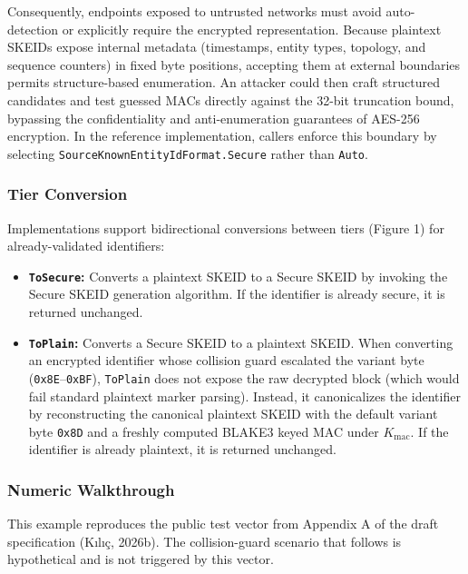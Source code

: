 \documentclass[fleqn,10pt]{wlpeerj}
\providecommand{\tightlist}{%
  \setlength{\itemsep}{0pt}\setlength{\parskip}{0pt}}
\begin{document}
Consequently, endpoints exposed to untrusted networks must avoid
auto-detection or explicitly require the encrypted representation.
Because plaintext SKEIDs expose internal metadata (timestamps, entity
types, topology, and sequence counters) in fixed byte positions,
accepting them at external boundaries permits structure-based
enumeration. An attacker could then craft structured candidates and test
guessed MACs directly against the 32-bit truncation bound, bypassing the
confidentiality and anti-enumeration guarantees of AES-256 encryption.
In the reference implementation, callers enforce this boundary by
selecting \texttt{SourceKnownEntityIdFormat.Secure} rather than
\texttt{Auto}.

\subsubsection{Tier Conversion}\label{tier-conversion}

Implementations support bidirectional conversions between tiers (Figure
1) for already-validated identifiers:

\begin{itemize}
\tightlist
\item
  \textbf{\texttt{ToSecure}:} Converts a plaintext SKEID to a Secure
  SKEID by invoking the Secure SKEID generation algorithm. If the
  identifier is already secure, it is returned unchanged.
\item
  \textbf{\texttt{ToPlain}:} Converts a Secure SKEID to a plaintext
  SKEID. When converting an encrypted identifier whose collision guard
  escalated the variant byte (\texttt{0x8E}--\texttt{0xBF}),
  \texttt{ToPlain} does not expose the raw decrypted block (which would
  fail standard plaintext marker parsing). Instead, it canonicalizes the
  identifier by reconstructing the canonical plaintext SKEID with the
  default variant byte \texttt{0x8D} and a freshly computed BLAKE3 keyed
  MAC under \(K_{\mathrm{mac}}\). If the identifier is already
  plaintext, it is returned unchanged.
\end{itemize}

\subsubsection{Numeric Walkthrough}\label{numeric-walkthrough}

This example reproduces the public test vector from Appendix A of the
draft specification (Kılıç, 2026b). The collision-guard scenario that
follows is hypothetical and is not triggered by this vector.
\end{document}
